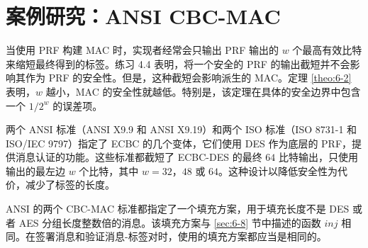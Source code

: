 \section{案例研究：ANSI CBC-MAC}\label{sec:6-9}

当使用 PRF 构建 MAC 时，实现者经常会只输出 PRF 输出的 $w$ 个最高有效比特来缩短最终得到的标签。练习 4.4 表明，将一个安全的 PRF 的输出截短并不会影响其作为 PRF 的安全性。但是，这种截短会影响派生的 MAC。定理 \ref{theo:6-2} 表明，$w$ 越小，MAC 的安全性就越低。特别是，该定理在具体的安全边界中包含一个 $1/2^w$ 的误差项。

两个 ANSI 标准（ANSI X9.9 和 ANSI X9.19）和两个 ISO 标准（ISO 8731-1 和 ISO/IEC 9797）指定了 ECBC 的几个变体，它们使用 DES 作为底层的 PRF，提供消息认证的功能。这些标准都截短了 ECBC-DES 的最终 $64$ 比特输出，只使用输出的最左边 $w$ 个比特，其中 $w=32$，$48$ 或 $64$。这种设计以降低安全性为代价，减少了标签的长度。

ANSI 的两个 CBC-MAC 标准都指定了一个填充方案，用于填充长度不是 DES 或者 AES 分组长度整数倍的消息。该填充方案与 \ref{sec:6-8} 节中描述的函数 $inj$ 相同。在签署消息和验证消息-标签对时，使用的填充方案都应当是相同的。